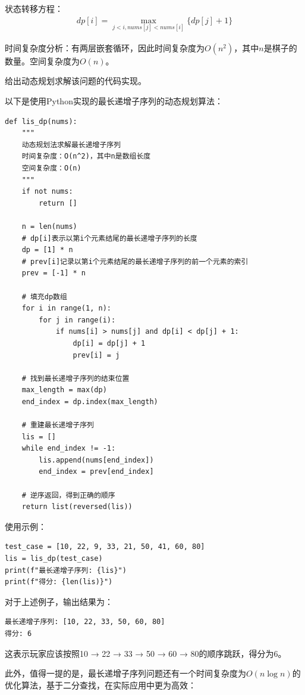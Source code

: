 \documentclass[12pt,twoside]{article}
\begin{document}
\begin{problems}
状态转移方程：
\begin{align}
dp[i] = \max_{j < i, nums[j] < nums[i]} \{dp[j] + 1\}
\end{align}

时间复杂度分析：有两层嵌套循环，因此时间复杂度为$O(n^2)$，其中$n$是棋子的数量。空间复杂度为$O(n)$。

\ppart 给出动态规划求解该问题的代码实现。

以下是使用Python实现的最长递增子序列的动态规划算法：

\begin{verbatim}
def lis_dp(nums):
    """
    动态规划法求解最长递增子序列
    时间复杂度：O(n^2)，其中n是数组长度
    空间复杂度：O(n)
    """
    if not nums:
        return []
    
    n = len(nums)
    # dp[i]表示以第i个元素结尾的最长递增子序列的长度
    dp = [1] * n
    # prev[i]记录以第i个元素结尾的最长递增子序列的前一个元素的索引
    prev = [-1] * n
    
    # 填充dp数组
    for i in range(1, n):
        for j in range(i):
            if nums[i] > nums[j] and dp[i] < dp[j] + 1:
                dp[i] = dp[j] + 1
                prev[i] = j
    
    # 找到最长递增子序列的结束位置
    max_length = max(dp)
    end_index = dp.index(max_length)
    
    # 重建最长递增子序列
    lis = []
    while end_index != -1:
        lis.append(nums[end_index])
        end_index = prev[end_index]
    
    # 逆序返回，得到正确的顺序
    return list(reversed(lis))
\end{verbatim}

使用示例：

\begin{verbatim}
test_case = [10, 22, 9, 33, 21, 50, 41, 60, 80]
lis = lis_dp(test_case)
print(f"最长递增子序列: {lis}")
print(f"得分: {len(lis)}")
\end{verbatim}

对于上述例子，输出结果为：

\begin{verbatim}
最长递增子序列: [10, 22, 33, 50, 60, 80]
得分: 6
\end{verbatim}

这表示玩家应该按照10 → 22 → 33 → 50 → 60 → 80的顺序跳跃，得分为6。

此外，值得一提的是，最长递增子序列问题还有一个时间复杂度为$O(n \log n)$的优化算法，基于二分查找，在实际应用中更为高效：


\end{problems}
\end{document}

